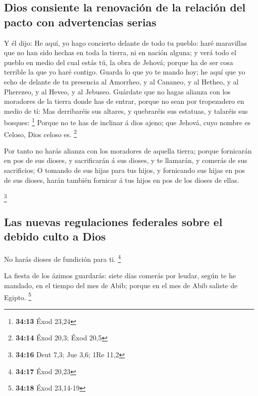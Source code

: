 \hypertarget{dios-consiente-la-renovaciuxf3n-de-la-relaciuxf3n-del-pacto-con-advertencias-serias}{%
\subsection{Dios consiente la renovación de la relación del pacto con
advertencias
serias}\label{dios-consiente-la-renovaciuxf3n-de-la-relaciuxf3n-del-pacto-con-advertencias-serias}}

 Y él dijo: He aquí, yo hago concierto delante de todo tu
pueblo: haré maravillas que no han sido hechas en toda la tierra, ni en
nación alguna; y verá todo el pueblo en medio del cual estás tú, la obra
de Jehová; porque ha de ser cosa terrible la que yo haré contigo.
 Guarda lo que yo te mando hoy; he aquí que yo echo de
delante de tu presencia al Amorrheo, y al Cananeo, y al Hetheo, y al
Pherezeo, y al Heveo, y al Jebuseo.  Guárdate que no hagas
alianza con los moradores de la tierra donde has de entrar, porque no
sean por tropezadero en medio de tí:  Mas derribaréis sus
altares, y quebraréis sus estatuas, y talaréis sus bosques: \footnote{\textbf{34:13}
  Éxod 23,24}  Porque no te has de inclinar á dios ajeno;
que Jehová, cuyo nombre es Celoso, Dios celoso es. \footnote{\textbf{34:14}
  Éxod 20,3; Éxod 20,5}

 Por tanto no harás alianza con los moradores de aquella
tierra; porque fornicarán en pos de sus dioses, y sacrificarán á sus
dioses, y te llamarán, y comerás de sus sacrificios;  O
tomando de sus hijas para tus hijos, y fornicando sus hijas en pos de
sus dioses, harán también fornicar á tus hijos en pos de los dioses de
ellas.

\footnote{\textbf{34:16} Deut 7,3; Jue 3,6; 1Re 11,2}

\hypertarget{las-nuevas-regulaciones-federales-sobre-el-debido-culto-a-dios}{%
\subsection{Las nuevas regulaciones federales sobre el debido culto a
Dios}\label{las-nuevas-regulaciones-federales-sobre-el-debido-culto-a-dios}}

 No harás dioses de fundición para ti. \footnote{\textbf{34:17}
  Éxod 20,23}

 La fiesta de los ázimos guardarás: siete días comerás por
leudar, según te he mandado, en el tiempo del mes de Abib; porque en el
mes de Abib saliste de Egipto. \footnote{\textbf{34:18} Éxod 23,14-19}

